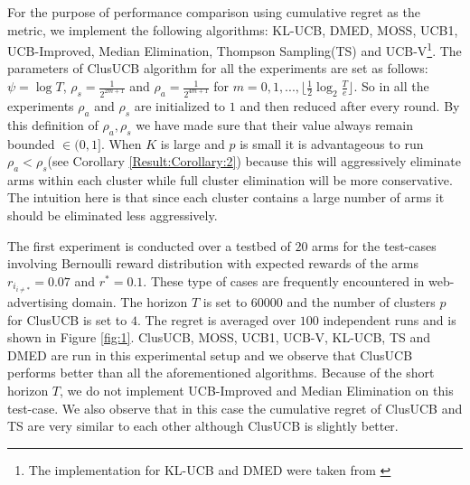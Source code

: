 For the purpose of performance comparison using cumulative regret as the metric, we implement the following algorithms:  KL-UCB\cite{garivier2011kl}, DMED\cite{honda2010asymptotically}, MOSS\cite{audibert2009minimax}, UCB1\cite{auer2002finite}, UCB-Improved\cite{auer2010ucb}, Median Elimination\cite{even2006action}, Thompson Sampling(TS)\cite{agrawal2011analysis} and UCB-V\cite{audibert2009exploration}\footnote{The implementation for KL-UCB and DMED were taken from \cite{CapGarKau12}}. The parameters of ClusUCB algorithm for all the experiments are set as follows: $\psi=\log T$, $\rho_{s}=\frac{1}{2^{2m+1}}$ and $\rho_{a}=\frac{1}{2^{4m+1}}$ for $m=0,1,..., \lfloor \frac{1}{2}\log_{2} \frac{T}{e}\rfloor$. So in all the experiments $\rho_{a}$ and $\rho_{s}$ are initialized to $1$ and then reduced after every round. By this definition of $\rho_{a},\rho_{s}$ we have made sure that their value always remain bounded $\in(0,1]$. When $K$ is large and $p$ is small it is advantageous to run $\rho_{a} < \rho_{s}$(see 
Corollary \ref{Result:Corollary:2}) because this will aggressively eliminate arms within each cluster while full cluster elimination will be more conservative. The intuition here is that since each cluster contains a large number of arms it should be eliminated less aggressively. 


The first experiment is conducted over a testbed of $20$ arms for the test-cases involving Bernoulli reward distribution with expected rewards of the arms $r_{i_{{i}\neq {*}}}=0.07$ and $r^{*}=0.1$. These type of cases are frequently encountered in web-advertising domain. The horizon $T$ is set to $60000$ and the number of clusters $p$ for ClusUCB is set to $4$. The regret is averaged over $100$ independent runs and is shown in Figure \ref{fig:1}. 
ClusUCB, MOSS, UCB1, UCB-V, KL-UCB, TS and DMED are run in this experimental setup and we observe that ClusUCB performs better than all the aforementioned algorithms. Because of the short horizon $T$, we do not implement UCB-Improved and Median Elimination on this test-case. We also observe that in this case the cumulative regret of ClusUCB and TS are very similar to each other although ClusUCB is slightly better.

